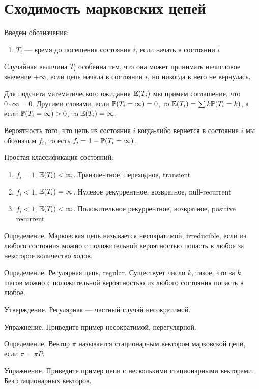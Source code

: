 \section{Сходимость марковских цепей}

Введем обозначения:

\begin{enumerate}
\item $T_i$ --- время до посещения состояния $i$, если начать в состоянии $i$
\end{enumerate}

Случайная величина $T_i$ особенна тем, что она может принимать нечисловое значение $+\infty$, если цепь начала в состоянии $i$, но никогда в него не вернулась. 

Для подсчета математического ожидания $\E(T_i)$ мы примем соглашение, что $0\cdot\infty=0$. Другими словами, если $\P(T_i=\infty)=0$, то $\E(T_i)=\sum k\P(T_i=k)$, а если $\P(T_i=\infty)>0$, то $\E(T_i)=\infty$.

Вероятность того, что цепь из состояния $i$ когда-либо вернется в состояние $i$ мы обозначим $f_i$, то есть $f_i=1-\P(T_i=\infty)$.

Простая классификация состояний:
\begin{enumerate}
\item $f_i=1$, $\E(T_i)<\infty$. Транзиентное, переходное, transient
\item $f_i<1$, $\E(T_i)=\infty$. Нулевое рекуррентное, возвратное, null-recurrent
\item $f_i<1$, $\E(T_i)<\infty$. Положительное рекуррентное, возвратное, positive recurrent
\end{enumerate}


Определение. Марковская цепь называется несократимой, irreducible, если из любого состояния можно с положительной вероятностью попасть в любое за некоторое количество ходов.

Определение. Регулярная цепь, regular. Существует число $k$, такое, что за $k$ шагов можно с положительной вероятностью из любого состояния попасть в любое.

Утверждение. Регулярная --- частный случай несократимой. 

Упражнение. Приведите пример несократимой, нерегулярной.



Определение. Вектор $\pi$ называется стационарным вектором марковской цепи, если $\pi=\pi P$.

Упражнение. Приведите пример цепи с несколькими стационарными векторами. Без стационарных векторов.


